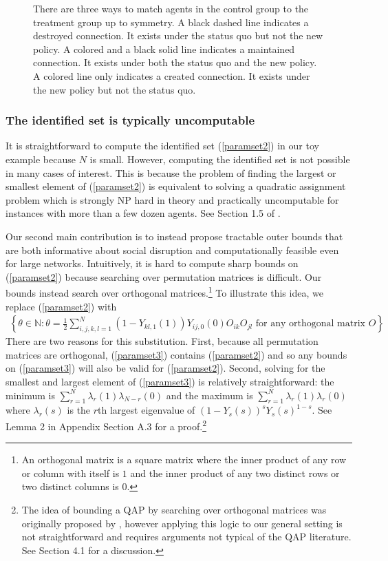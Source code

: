 \documentclass[12pt]{article}
\theoremstyle{definition}
\begin{document}
\begin{figure}
\centering

\vspace{-6mm}
\caption{There are three ways to match agents in the control group to the treatment group up to symmetry. A black dashed line indicates a destroyed connection. It exists under the status quo but not the new policy. A colored and a black solid line indicates a maintained connection. It exists under both the status quo and the new policy. A colored line only indicates a created connection. It exists under the new policy but not the status quo.}
\label{fig:toyexample_matrix}
\end{figure}




\subsubsection{The identified set is typically uncomputable}
It is straightforward to compute the identified set (\ref{paramset2}) in our toy example because $N$ is small. However, computing the identified set is not possible in many cases of interest. This is because the problem of finding the largest or smallest element of (\ref{paramset2}) is equivalent to solving a quadratic assignment problem which is strongly NP hard in theory and practically uncomputable for instances with more than a few dozen agents. See Section 1.5 of \cite{cela2013quadratic}.    

Our second main contribution is to instead propose tractable outer bounds that are both informative about social disruption and computationally feasible even for large networks. Intuitively, it is hard to compute sharp bounds on  (\ref{paramset2}) because searching over permutation matrices is difficult. Our bounds instead search over orthogonal matrices.\footnote{An orthogonal matrix is a square matrix where the inner product of any row or column with itself is $1$ and the inner product of any two distinct rows or two distinct columns is $0$.} To illustrate this idea, we replace (\ref{paramset2}) with 
 \begin{align}\label{paramset3}
 \left\{\theta \in \mathbb{N}: \theta = \frac{1}{2}\sum_{i,j,k,l = 1}^{N}(1-Y_{kl,1}(1))Y_{ij,0}(0)O_{ik}O_{jl} \text{ for any orthogonal matrix } O \right\}.
 \end{align}
There are two reasons for this substitution. First, because all permutation matrices are orthogonal, (\ref{paramset3}) contains (\ref{paramset2}) and so any bounds on (\ref{paramset3})  will also be valid for (\ref{paramset2}). Second, solving for the smallest and largest element of (\ref{paramset3})  is relatively straightforward: the minimum is $\sum_{r=1}^{N}\lambda_{r}(1)\lambda_{N-r}(0)$ and the maximum is  $\sum_{r=1}^{N}\lambda_{r}(1)\lambda_{r}(0)$ where $\lambda_{r}(s)$ is the $r$th largest eigenvalue of $(1-Y_{s}(s))^{s}Y_{s}(s)^{1-s}$. See Lemma 2 in Appendix Section A.3 for a proof.\footnote{The idea of bounding a QAP by searching over orthogonal matrices was originally proposed by \cite{finke1987quadratic}, however applying this logic to our general setting is not straightforward and requires arguments not typical of the QAP literature. See Section 4.1 for a discussion. }   
\end{document}
